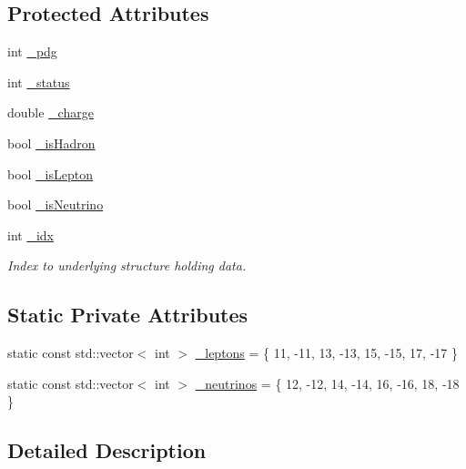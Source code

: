 \subsection*{Protected Attributes}
\begin{DoxyCompactItemize}
\item 
int \hyperlink{classAnalysis_1_1FastJet_1_1TruthInfo_a667df4369792991c7882f89bc120e3e1}{\+\_\+pdg}
\item 
int \hyperlink{classAnalysis_1_1FastJet_1_1TruthInfo_a9da9ba4c65c112317584823af4de0bd7}{\+\_\+status}
\item 
double \hyperlink{classAnalysis_1_1FastJet_1_1TruthInfo_a44a9ca75492ca6e4e788e559f9afb1e7}{\+\_\+charge}
\item 
bool \hyperlink{classAnalysis_1_1FastJet_1_1TruthInfo_a3a86cf67d7da9be46ccd842723a75bcb}{\+\_\+is\+Hadron}
\item 
bool \hyperlink{classAnalysis_1_1FastJet_1_1TruthInfo_afa94b750c98dede7d4fa6a48c459dd5d}{\+\_\+is\+Lepton}
\item 
bool \hyperlink{classAnalysis_1_1FastJet_1_1TruthInfo_a18a62f405e19e57214a4ca36f815a2a0}{\+\_\+is\+Neutrino}
\item 
int \hyperlink{classAnalysis_1_1FastJet_1_1UserInfo_ad9aa33e317aea2b675493b664cc718a3}{\+\_\+idx}
\begin{DoxyCompactList}\small\item\em Index to underlying structure holding data. \end{DoxyCompactList}\end{DoxyCompactItemize}
\subsection*{Static Private Attributes}
\begin{DoxyCompactItemize}
\item 
static const std\+::vector$<$ int $>$ \hyperlink{classAnalysis_1_1FastJet_1_1TruthInfo_a23c0cd8c38cbc6613aafb00170365437}{\+\_\+leptons} = \{ 11, -\/11, 13, -\/13, 15, -\/15, 17, -\/17 \}
\item 
static const std\+::vector$<$ int $>$ \hyperlink{classAnalysis_1_1FastJet_1_1TruthInfo_a79f2101d71790e8f4a9bbb42843b3c26}{\+\_\+neutrinos} = \{ 12, -\/12, 14, -\/14, 16, -\/16, 18, -\/18 \}
\end{DoxyCompactItemize}


\subsection{Detailed Description}


